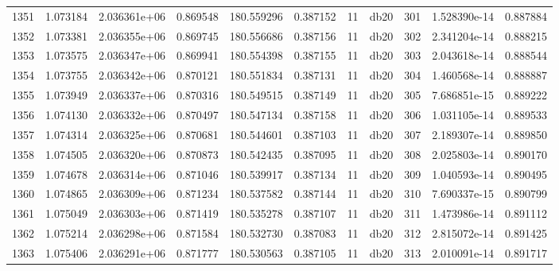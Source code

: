 \begin{tabular}{lrrrrrrlrrr}
1351 &    1.073184 &        2.036361e+06 &  0.869548 &              180.559296 &    0.387152 &      11 &         db20 &    301 &   1.528390e-14 &      0.887884 \\
1352 &    1.073381 &        2.036355e+06 &  0.869745 &              180.556686 &    0.387156 &      11 &         db20 &    302 &   2.341204e-14 &      0.888215 \\
1353 &    1.073575 &        2.036347e+06 &  0.869941 &              180.554398 &    0.387155 &      11 &         db20 &    303 &   2.043618e-14 &      0.888544 \\
1354 &    1.073755 &        2.036342e+06 &  0.870121 &              180.551834 &    0.387131 &      11 &         db20 &    304 &   1.460568e-14 &      0.888887 \\
1355 &    1.073949 &        2.036337e+06 &  0.870316 &              180.549515 &    0.387149 &      11 &         db20 &    305 &   7.686851e-15 &      0.889222 \\
1356 &    1.074130 &        2.036332e+06 &  0.870497 &              180.547134 &    0.387158 &      11 &         db20 &    306 &   1.031105e-14 &      0.889533 \\
1357 &    1.074314 &        2.036325e+06 &  0.870681 &              180.544601 &    0.387103 &      11 &         db20 &    307 &   2.189307e-14 &      0.889850 \\
1358 &    1.074505 &        2.036320e+06 &  0.870873 &              180.542435 &    0.387095 &      11 &         db20 &    308 &   2.025803e-14 &      0.890170 \\
1359 &    1.074678 &        2.036314e+06 &  0.871046 &              180.539917 &    0.387134 &      11 &         db20 &    309 &   1.040593e-14 &      0.890495 \\
1360 &    1.074865 &        2.036309e+06 &  0.871234 &              180.537582 &    0.387144 &      11 &         db20 &    310 &   7.690337e-15 &      0.890799 \\
1361 &    1.075049 &        2.036303e+06 &  0.871419 &              180.535278 &    0.387107 &      11 &         db20 &    311 &   1.473986e-14 &      0.891112 \\
1362 &    1.075214 &        2.036298e+06 &  0.871584 &              180.532730 &    0.387083 &      11 &         db20 &    312 &   2.815072e-14 &      0.891425 \\
1363 &    1.075406 &        2.036291e+06 &  0.871777 &              180.530563 &    0.387105 &      11 &         db20 &    313 &   2.010091e-14 &      0.891717 \\

\end{tabular}
